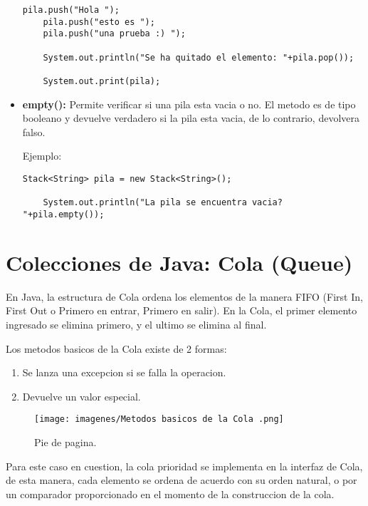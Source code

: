 \documentclass[12pt, letterpaper]{article} %
\begin{document}
\begin{itemize}
\begin{lstlisting}[frame=single]
    pila.push("Hola ");
    pila.push("esto es ");
    pila.push("una prueba :) ");

    System.out.println("Se ha quitado el elemento: "+pila.pop());

    System.out.print(pila);
    \end{lstlisting}

    \item \textbf{empty():} Permite verificar si una pila esta vacia o no. El metodo es de tipo booleano y devuelve verdadero si la pila esta vacia, de lo contrario, devolvera falso.

    Ejemplo:
    \lstset{language = Java, breaklines=true, basicstyle=\footnotesize}
    \begin{lstlisting}[frame=single]
    Stack<String> pila = new Stack<String>();

    System.out.println("La pila se encuentra vacia? "+pila.empty());
    \end{lstlisting}
\end{itemize}

\section{Colecciones de Java: Cola (Queue)}
En Java, la estructura de Cola ordena los elementos de la manera FIFO (First In, First Out o Primero en entrar, Primero en salir). En la Cola, el primer elemento ingresado se elimina primero, y el ultimo se elimina al final.

Los metodos basicos de la Cola existe de 2 formas:
\begin{enumerate}
    \item Se lanza una excepcion si se falla la operacion.
    \item Devuelve un valor especial.
\end{enumerate}
\begin{figure}[h]
    \centering
    \texttt{[image: imagenes/Metodos basicos de la Cola .png]}
    \caption{Pie de pagina.}
    \label{fig:tabla}
\end{figure}
Para este caso en cuestion, la cola prioridad se implementa en la interfaz de Cola, de esta manera, cada elemento se ordena de acuerdo con su orden natural, o por un comparador proporcionado en el momento de la construccion de la cola.
\end{document}
